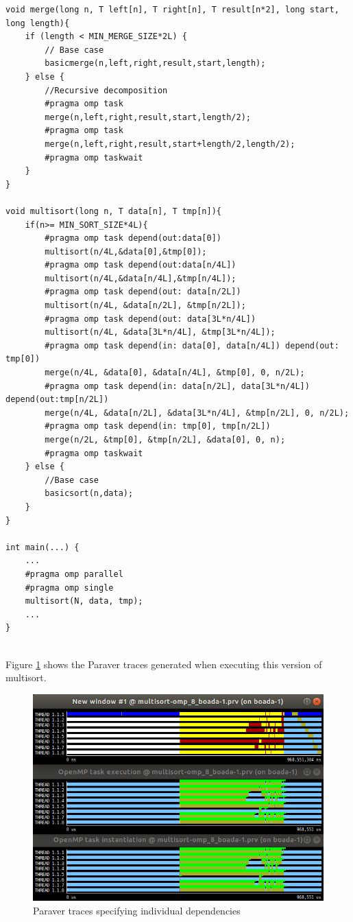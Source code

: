 \documentclass[12]{article}
\begin{document}
\begin{lstlisting}[frame=single]
void merge(long n, T left[n], T right[n], T result[n*2], long start, long length){
    if (length < MIN_MERGE_SIZE*2L) {
        // Base case
        basicmerge(n,left,right,result,start,length);
    } else {
        //Recursive decomposition
        #pragma omp task
        merge(n,left,right,result,start,length/2);
        #pragma omp task
        merge(n,left,right,result,start+length/2,length/2);
        #pragma omp taskwait
    }
}

void multisort(long n, T data[n], T tmp[n]){
    if(n>= MIN_SORT_SIZE*4L){
        #pragma omp task depend(out:data[0])
        multisort(n/4L,&data[0],&tmp[0]);
        #pragma omp task depend(out:data[n/4L])
        multisort(n/4L,&data[n/4L],&tmp[n/4L]);
        #pragma omp task depend(out: data[n/2L])
        multisort(n/4L, &data[n/2L], &tmp[n/2L]);
        #pragma omp task depend(out: data[3L*n/4L])
        multisort(n/4L, &data[3L*n/4L], &tmp[3L*n/4L]);
        #pragma omp task depend(in: data[0], data[n/4L]) depend(out: tmp[0])
        merge(n/4L, &data[0], &data[n/4L], &tmp[0], 0, n/2L);
        #pragma omp task depend(in: data[n/2L], data[3L*n/4L]) depend(out:tmp[n/2L])
        merge(n/4L, &data[n/2L], &data[3L*n/4L], &tmp[n/2L], 0, n/2L);
        #pragma omp task depend(in: tmp[0], tmp[n/2L])
        merge(n/2L, &tmp[0], &tmp[n/2L], &data[0], 0, n);
        #pragma omp taskwait
    } else {
        //Base case
        basicsort(n,data);
    }
}

int main(...) {
    ...
    #pragma omp parallel
    #pragma omp single
    multisort(N, data, tmp);
    ...
}
\end{lstlisting}
\\
Figure \ref{paraverdepend} shows the Paraver traces generated when executing this version of multisort.
\\
\medskip
\begin{figure}[H]
    \centering
    \includegraphics[scale=0.75]{images/paraverDependNoZoom.PNG}
    \caption{Paraver traces specifying individual dependencies}
    \label{paraverdepend}
\end{figure}
\end{document}
